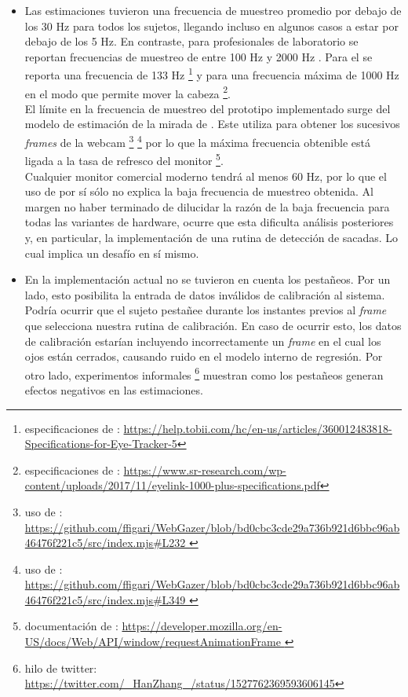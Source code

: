 \begin{itemize}
  \item Las estimaciones tuvieron una frecuencia de muestreo promedio por
debajo de los 30 Hz para todos los sujetos, llegando incluso en algunos casos a
estar por debajo de los 5 Hz.
  En contraste, para \eyetrackers profesionales de laboratorio se reportan
frecuencias de muestreo de entre 100 Hz y 2000 Hz \cite{hosp_2020_remote_eye}.
  Para el \tobii se reporta una frecuencia de 133 Hz \footnote{especificaciones
de \tobii:
\url{https://help.tobii.com/hc/en-us/articles/360012483818-Specifications-for-Eye-Tracker-5}}
y para \eyelink una frecuencia máxima de 1000 Hz en el modo que permite mover
la cabeza \footnote{especificaciones de \eyelink:
\url{https://www.sr-research.com/wp-content/uploads/2017/11/eyelink-1000-plus-specifications.pdf}}.
\\
  El límite en la frecuencia de muestreo del prototipo implementado surge del
modelo de estimación de la mirada de \webgazer.
  Este utiliza \raf para obtener los sucesivos \textit{frames} de la webcam
\footnote{uso de \raf: \url{
https://github.com/ffigari/WebGazer/blob/bd0cbc3cde29a736b921d6bbc96ab46476f221c5/src/index.mjs\#L232
}} \footnote{uso de \raf: \url{
https://github.com/ffigari/WebGazer/blob/bd0cbc3cde29a736b921d6bbc96ab46476f221c5/src/index.mjs\#L349
}} por lo que la máxima frecuencia obtenible está ligada a la tasa de refresco
del monitor \footnote{documentación de \raf: \url{
https://developer.mozilla.org/en-US/docs/Web/API/window/requestAnimationFrame
}}. \\
  Cualquier monitor comercial moderno tendrá al menos 60 Hz, por lo que el uso
de \raf por sí sólo no explica la baja frecuencia de muestreo obtenida.
  Al margen no haber terminado de dilucidar la razón de la baja frecuencia para
todas las variantes de hardware, ocurre que esta dificulta análisis posteriores
y, en particular, la implementación de una rutina de detección de sacadas.
  Lo cual implica un desafío en sí mismo.

  \item En la implementación actual no se tuvieron en cuenta los pestañeos.
  Por un lado, esto posibilita la entrada de datos inválidos de calibración al
sistema.
  Podría ocurrir que el sujeto pestañee durante los instantes previos al
\textit{frame} que selecciona nuestra rutina de calibración.
  En caso de ocurrir esto, los datos de calibración estarían incluyendo
incorrectamente un \textit{frame} en el cual los ojos están cerrados, causando
ruido en el modelo interno de regresión.
  Por otro lado, experimentos informales \footnote{hilo de twitter:
\url{https://twitter.com/_HanZhang_/status/1527762369593606145}} muestran como
los pestañeos generan efectos negativos en las estimaciones.


\end{itemize}
